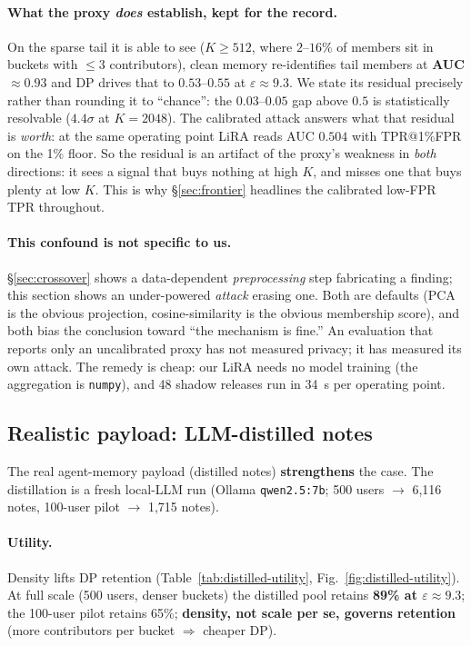 \documentclass[pdflatex,sn-mathphys-num,12pt]{sn-jnl}
\theoremstyle{thmstyleone}%
\theoremstyle{thmstyletwo}%
\theoremstyle{thmstylethree}%
\newcommand{\eps}{\varepsilon}
\newcommand{\secref}[1]{\S\ref{#1}}
\begin{document}
\paragraph{What the proxy \emph{does} establish, kept for the record.} On the sparse tail it
is able to see ($K \geq 512$, where $2$--$16\%$ of members sit in buckets with $\leq 3$
contributors), clean memory re-identifies tail members at \textbf{AUC $\approx 0.93$} and DP
drives that to $0.53$--$0.55$ at $\eps \approx 9.3$. We state its residual precisely rather
than rounding it to ``chance'': the $0.03$--$0.05$ gap above $0.5$ is statistically
resolvable ($4.4\sigma$ at $K = 2048$). The calibrated attack answers what that residual is
\emph{worth}: at the same operating point LiRA reads AUC $0.504$ with TPR@1\%FPR on the 1\%
floor. So the residual is an artifact of the proxy's weakness in \emph{both} directions:
it sees a signal that buys nothing at high $K$, and misses one that buys plenty at low $K$.
This is why \secref{sec:frontier} headlines the calibrated low-FPR TPR throughout.

\paragraph{This confound is not specific to us.} \secref{sec:crossover} shows a
data-dependent \emph{preprocessing} step fabricating a finding; this section shows an
under-powered \emph{attack} erasing one. Both are defaults (PCA is the obvious projection,
cosine-similarity is the obvious membership score), and both bias the conclusion toward
``the mechanism is fine.'' An evaluation that reports only an uncalibrated proxy has not
measured privacy; it has measured its own attack. The remedy is cheap: our LiRA needs no model
training (the aggregation is \texttt{numpy}), and 48 shadow releases run in
\SI{34}{\second} per operating point.

\subsection{Realistic payload: LLM-distilled notes}\label{sec:distilled}

The real agent-memory payload (distilled notes) \textbf{strengthens} the case. The
distillation is a fresh local-LLM run (Ollama \texttt{qwen2.5:7b}; 500 users $\to$ 6{,}116
notes, 100-user pilot $\to$ 1{,}715 notes).

\paragraph{Utility.} Density lifts DP retention (Table~\ref{tab:distilled-utility},
Fig.~\ref{fig:distilled-utility}). At full scale (500 users, denser buckets) the distilled
pool retains \textbf{89\% at $\eps \approx 9.3$}; the 100-user pilot retains 65\%;
\textbf{density, not scale per se, governs retention} (more contributors per bucket
$\Rightarrow$ cheaper DP).
\end{document}
